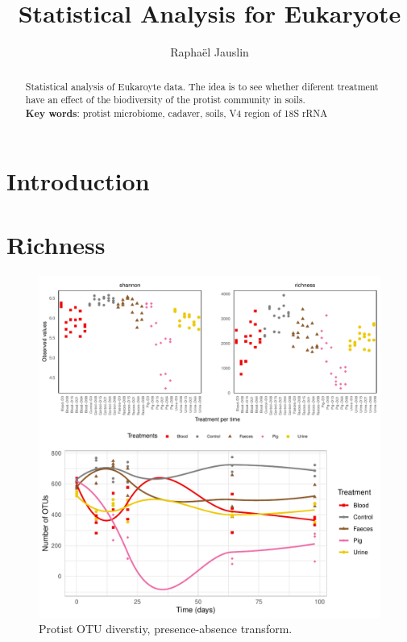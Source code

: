 \documentclass[11pt,english]{article}\usepackage[]{graphicx}\usepackage{xcolor}
\title{Statistical Analysis for Eukaryote}
\author{\myalphafoot Rapha\"el Jauslin\footnotemark[1]}
\date{}
\makeatletter
\def\maxwidth{ %
  \ifdim\Gin@nat@width>\linewidth
    \linewidth
  \else
    \Gin@nat@width
  \fi
}
\newenvironment{knitrout}{}{} %
\makeatother
\begin{document}




\begin{abstract}
Statistical analysis of Eukaroyte data. The idea is to see whether diferent treatment have an effect of the biodiversity of the protist community in soils.\\
\textbf{Key words}: protist microbiome, cadaver, soils, V4 region of 18S rRNA
\end{abstract}

\newpage
\section{Introduction}


\section{Richness}




% 








\begin{figure}[ht!]
\centering
\begin{knitrout}
\color{fgcolor}
\includegraphics[width=\maxwidth]{figure/image-div-1} 

\end{knitrout}
\caption{Protist OTU diverstiy, presence-absence transform.}
\label{fig:loess}
\end{figure}
\end{document}
